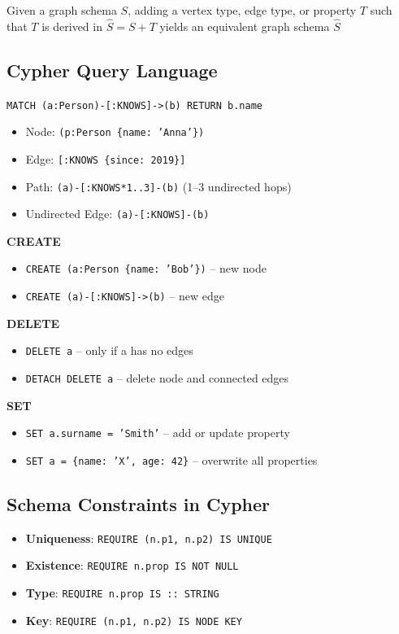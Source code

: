 \documentclass{article}
\begin{document}
Given a graph schema $S$, adding a vertex type, edge type, or property $T$ such that $T$ is derived in $\hat{S} = S + T$ yields an equivalent graph schema $\hat{S}$

\subsection*{Cypher Query Language}

\texttt{MATCH (a:Person)-[:KNOWS]->(b) RETURN b.name}

\begin{itemize}
  \item Node: \texttt{(p:Person \{name: 'Anna'\})}
  \item Edge: \texttt{[:KNOWS \{since: 2019\}]}
  \item Path: \texttt{(a)-[:KNOWS*1..3]-(b)} (1--3 undirected hops)
  \item Undirected Edge: \texttt{(a)-[:KNOWS]-(b)}
\end{itemize}

\textbf{CREATE}
\begin{itemize}
  \item \texttt{CREATE (a:Person \{name: 'Bob'\})} -- new node
  \item \texttt{CREATE (a)-[:KNOWS]->(b)} -- new edge
\end{itemize}

\textbf{DELETE}
\begin{itemize}
  \item \texttt{DELETE a} -- only if a has no edges
  \item \texttt{DETACH DELETE a} -- delete node and connected edges
\end{itemize}

\textbf{SET}
\begin{itemize}
  \item \texttt{SET a.surname = 'Smith'} -- add or update property
  \item \texttt{SET a = \{name: 'X', age: 42\}} -- overwrite all properties
\end{itemize}

\subsection*{Schema Constraints in Cypher}
\begin{itemize}
  \item \textbf{Uniqueness}: \texttt{REQUIRE (n.p1, n.p2) IS UNIQUE}
  \item \textbf{Existence}: \texttt{REQUIRE n.prop IS NOT NULL}
  \item \textbf{Type}: \texttt{REQUIRE n.prop IS :: STRING}
  \item \textbf{Key}: \texttt{REQUIRE (n.p1, n.p2) IS NODE KEY}
\end{itemize}
\end{document}
